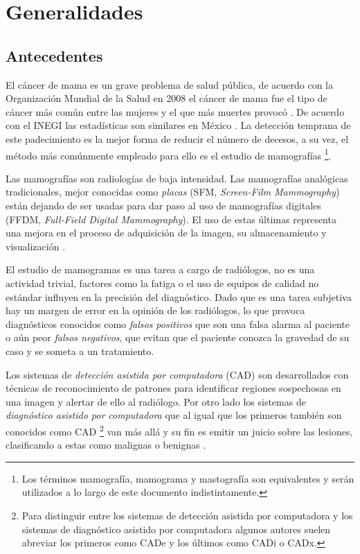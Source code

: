 \chapter{Generalidades}
\label{generalidades}

 \setcounter{page}{1}

\section{Antecedentes}

El cáncer de mama es un grave problema de salud pública, de acuerdo con la
Organización Mundial de la Salud en 2008 el cáncer de mama fue el tipo de
cáncer más común entre las mujeres y el que más muertes provocó
\cite{cancerreport}. De acuerdo con el INEGI las estadísticas son similares en
México \cite{mxcancer, inegi}. La detección temprana de este padecimiento es la
mejor forma de reducir el número de decesos, a su vez, el método más comúnmente
empleado para ello es el estudio de mamografías \footnote{Los términos
mamografía, mamograma y mastografía son equivalentes y serán utilizados a lo
largo de este documento indistintamente.}. 

Las mamografías son radiologías de baja intensidad. Las mamografías analógicas
tradicionales, mejor conocidas como \textit{placas} (SFM, \textit{Screen-Film
Mammography}) están dejando de ser usadas para dar paso al uso de mamografías
digitales (FFDM, \textit{Full-Field Digital Mammography}). El uso de estas
últimas representa una mejora en el proceso de adquisición de la imagen, su
almacenamiento y visualización \cite{pisano2000current}.

El estudio de mamogramas es una tarea a cargo de radiólogos, no es una
actividad trivial, factores como la fatiga o el uso de equipos de calidad no
estándar influyen en la precisión del diagnóstico. Dado que es una tarea
subjetiva hay un margen de error en la opinión de los radiólogos, lo que
provoca diagnósticos conocidos como \textit{falsos positivos} que son una falsa
alarma al paciente o aún peor \textit{falsos negativos}, que evitan que el
paciente conozca la gravedad de su caso y se someta a un tratamiento.

Los sistemas de \textit{detección asistida por computadora} (CAD) son
desarrollados con técnicas de reconocimiento de patrones para identificar
regiones sospechosas en una imagen y alertar de ello al radiólogo. Por otro
lado los sistemas de \textit{diagnóstico asistido por computadora} que al igual
que los primeros también son conocidos como CAD \footnote{Para distinguir entre
los sistemas de detección asistida por computadora y los sistemas de
diagnóstico asistido por computadora algunos autores suelen abreviar los
primeros como CADe y los últimos como CADi o CADx.} van más allá y su fin es
emitir un juicio sobre las lesiones, clasificando a estas como malignas o
benignas \cite{castellino2005computer}. 

